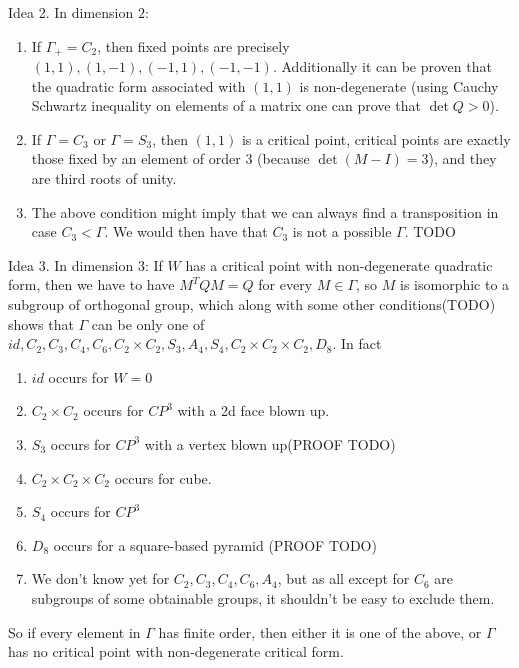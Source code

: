 \documentclass[a4paper]{article}
\begin{document}
Idea 2.
In dimension $2$:
\begin{enumerate}
	\item If $\Gamma_+ = C_2$, then fixed points are precisely $(1,1), (1,-1), (-1,1), (-1, -1)$. Additionally it can be proven that the quadratic form associated with $(1,1)$ is non-degenerate (using Cauchy Schwartz inequality on elements of a matrix one can prove that $\det Q > 0$).
	\item If $\Gamma = C_3$ or $\Gamma = S_3$, then $(1,1)$ is a critical point, critical points are exactly those fixed by an element of order $3$ (because $\det(M-I) = 3$), and they are third roots of unity.
	\item The above condition might imply that we can always find a transposition in case $C_3 < \Gamma$. We would then have that $C_3$ is not a possible $\Gamma$. TODO
\end{enumerate}
Idea 3.
In dimension 3:
If $W$ has a critical point with non-degenerate quadratic form, then we have to have $M^T Q M = Q$ for every $M \in \Gamma$, so $M$ is isomorphic to a subgroup of orthogonal group, which along with some other conditions(TODO) shows that $\Gamma$ can be only one of $id, C_2, C_3, C_4, C_6, C_2 \times C_2, S_3, A_4, S_4, C_2 \times C_2 \times C_2, D_8$. In fact
\begin{enumerate}
	\item $id$ occurs for $W = 0$
	\item $C_2 \times C_2$ occurs for $CP^3$ with a 2d face blown up.
	\item $S_3$ occurs for $CP^3$ with a vertex blown up(PROOF TODO)
	\item $C_2 \times C_2 \times C_2$ occurs for cube.
	\item $S_4$ occurs for $CP^3$
	\item $D_8$ occurs for a square-based pyramid (PROOF TODO)
	\item We don't know yet for $C_2, C_3, C_4, C_6, A_4$, but as all except for $C_6$ are subgroups of some obtainable groups, it shouldn't be easy to exclude them.
\end{enumerate}
So if every element in $\Gamma$ has finite order, then either it is one of the above, or $\Gamma$ has no critical point with non-degenerate critical form.
\end{document}
